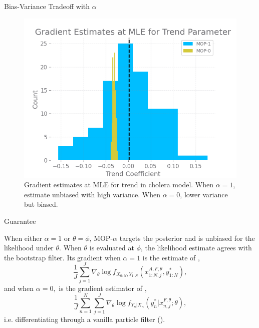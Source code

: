 \documentclass{beamer}
\begin{document}
\begin{frame}{Bias-Variance Tradeoff with $\alpha$}
\begin{figure}
    \centering
    \includegraphics[scale=0.5]{imgs/mlegrad.png}
    \caption{Gradient estimates at MLE for trend in \cite{king08} cholera model. When $\alpha=1$, estimate unbiased with high variance. When $\alpha=0$, lower variance but biased.}
    \label{fig:bias-variance}
\end{figure}
    
\end{frame}

\begin{frame}{Guarantee}
    \begin{prop}
    \label{prop:mop-correctness}
    When either $\alpha=1$ or $\theta=\phi$, MOP-$\alpha$ targets the posterior and is unbiased for the likelihood under $\theta$. 
    When $\theta$ is evaluated at $\phi$, the likelihood estimate agrees with the bootstrap filter. Its gradient when $\alpha=1$ is the estimate of \citet{poyiadjis11},
    $$\frac{1}{J}\sum_{j=1}^J \nabla_\theta \log f_{X_{0:N}, Y_{1:N}}(x_{1:N,j}^{A, F,\theta}, y_{1:N}^*),$$
    and when $\alpha=0,$ is the gradient estimator of \cite{blei2018vsmc},
    $$
        \frac{1}{J} \sum_{n=1}^N \sum_{j=1}^J \nabla_\theta \log f_{Y_n|X_{n}}(y_n^*|x_{n,j}^{F, \theta}; \theta),
    $$
    i.e. differentiating through a vanilla particle filter (\cite{scibior21}).
\end{prop}
\end{frame}
\end{document}

